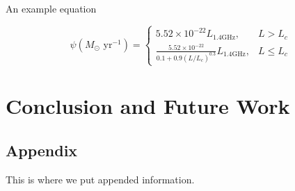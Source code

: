 \documentclass[a4paper,12pt,titlepage]{article}
\begin{document}
An example equation

\begin{equation}
  \psi(M_{\odot} \text{ yr}^{-1})=
  \begin{cases}
    5.52\times10^{-22}L_{1.4\text{GHz}}, & L>L_c\\
    \frac{5.52\times10^{-22}}{0.1+0.9(L/L_c)^{0.3}}L_{1.4\text{GHz}}, & L\leq L_c
  \end{cases}
  \label{eq:sfr-Lr}
\end{equation}


\section{Conclusion and Future Work}\label{sec:conlusion}

\begin{appendix}
\section{Appendix}\label{sec:app}

This is where we put appended information.

\end{appendix}



\clearpage

\setlength{\bibsep}{0pt}


\end{document}
